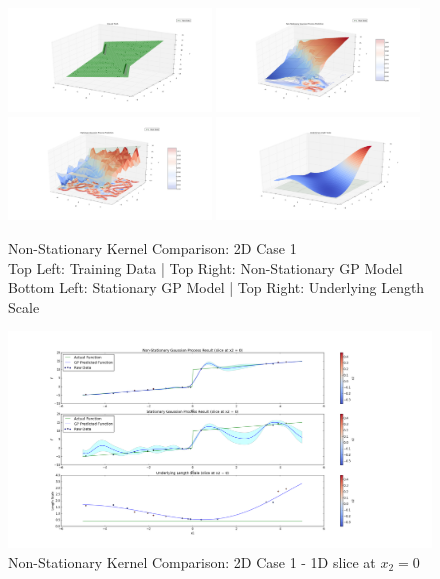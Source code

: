 				\begin{figure}[!htbp]
					\centering
						\includegraphics[width=0.48\textwidth]{Figures/Progress/figure_2Dcase1_1.png}
						\includegraphics[width=0.48\textwidth]{Figures/Progress/figure_2Dcase1_2.png}
						\includegraphics[width=0.48\textwidth]{Figures/Progress/figure_2Dcase1_3.png}
						\includegraphics[width=0.48\textwidth]{Figures/Progress/figure_2Dcase1_4.png}
					\caption{Non-Stationary Kernel Comparison: 2D Case 1 \\
						Top Left: Training Data | Top Right: Non-Stationary GP Model \\
						Bottom Left: Stationary GP Model | Top Right: Underlying Length Scale}
					\label{ProgressReport:GaussianProcessModels:Figure:figure_2Dcase1}
				\end{figure}

				\begin{figure}[!htbp]
					\centering
						\includegraphics[width=\textwidth]{Figures/Progress/figure_2Dcase1_5.png}
					\caption{Non-Stationary Kernel Comparison: 2D Case 1 - 1D slice at $x_{2} = 0$}
					\label{ProgressReport:GaussianProcessModels:Figure:figure_2Dcase1_5}
				\end{figure}

